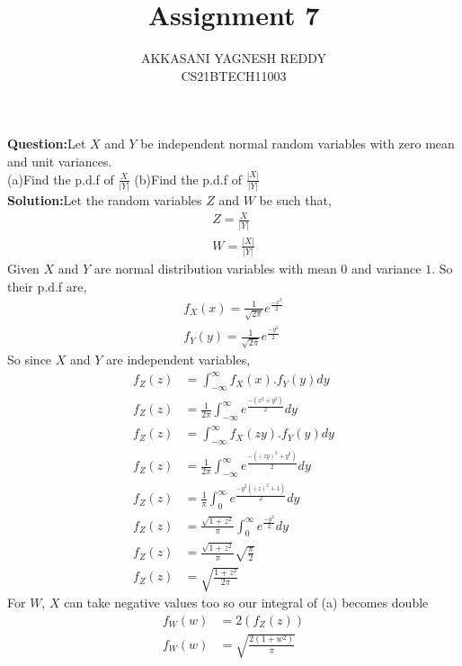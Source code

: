 \documentclass[journal,12pt,twocolumn]{IEEEtran}
\title{Assignment 7}
\author{AKKASANI YAGNESH REDDY \\
     CS21BTECH11003 \\}
\begin{document}
     \maketitle
     
     \textbf{Question:}Let $X$ and $Y$ be independent normal random variables with zero mean and unit variances.\\
     (a)Find the p.d.f of $\frac{X}{|Y|}$
     (b)Find the p.d.f of $\frac{|X|}{|Y|}$\\
     
     \textbf{Solution:}Let the random variables $Z$ and $W$ be such that,
     \begin{align}
         Z=\frac{X}{|Y|}\\
         W=\frac{|X|}{|Y|}
          \end{align}
    Given $X$ and $Y$ are normal distribution variables with mean $0$ and variance $1$. So their p.d.f are,
    \begin{align}
        f_{X}(x)=\frac{1}{\sqrt{2\pi}}e^{\frac{-x^{2}}{2}}\\
        f_{Y}(y)=\frac{1}{\sqrt{2\pi}}e^{\frac{-y^{2}}{2}}
        \end{align}
     So since $X$ and $Y$ are independent variables,
     \begin{align}
      f_{Z}(z)&=\int_{-\infty}^{\infty}f_{X}(x).f_{Y}(y)dy\\
      f_{Z}(z)&=\frac{1}{2\pi}\int_{-\infty}^{\infty}e^{\frac{-(x^{2}+y^{2})}{2}}dy\\
      f_{Z}(z)&=\int_{-\infty}^{\infty}f_{X}(zy).f_{Y}(y)dy\\
     f_{Z}(z)&=\frac{1}{2\pi}\int_{-\infty}^{\infty}e^{\frac{-((zy)^{2}+y^{2})}{2}}dy\\
     f_{Z}(z)&=\frac{1}{\pi}\int_{0}^{\infty}e^{\frac{-y^{2}((z)^{2}+1)}{2}}dy\\
      f_{Z}(z)&=\frac{\sqrt{1+z^{2}}}{\pi}\int_{0}^{\infty}e^{\frac{-y^{2}}{2}}dy\\
         f_{Z}(z)&=\frac{\sqrt{1+z^{2}}}{\pi}\sqrt{\frac{\pi}{2}}\\
         f_{Z}(z)&=\sqrt{\frac{1+z^{2}}{2\pi}}
     \end{align}
     For $W$, $X$ can take negative values too so our integral of (a) becomes double
     \begin{align}
          f_{W}(w)&=2( f_{Z}(z))\\
         f_{W}(w)&=\sqrt{\frac{2(1+w^{2})}{\pi}}
     \end{align}
     
     
\end{document}
